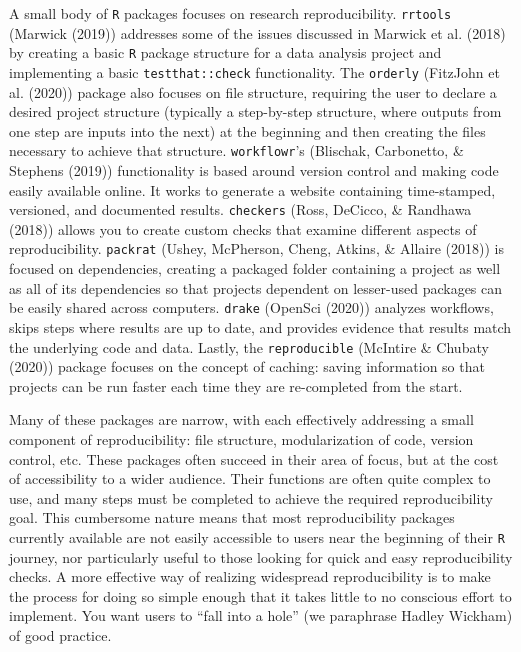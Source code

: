 \documentclass[12pt,twoside]{reedthesis}
\begin{document}
A small body of \texttt{R} packages focuses on research reproducibility.
\texttt{rrtools} (Marwick (2019)) addresses some of the issues discussed
in Marwick et al. (2018) by creating a basic \texttt{R} package
structure for a data analysis project and implementing a basic
\texttt{testthat::check} functionality. The \texttt{orderly} (FitzJohn
et al. (2020)) package also focuses on file structure, requiring the
user to declare a desired project structure (typically a step-by-step
structure, where outputs from one step are inputs into the next) at the
beginning and then creating the files necessary to achieve that
structure. \texttt{workflowr}'s (Blischak, Carbonetto, \& Stephens
(2019)) functionality is based around version control and making code
easily available online. It works to generate a website containing
time-stamped, versioned, and documented results. \texttt{checkers}
(Ross, DeCicco, \& Randhawa (2018)) allows you to create custom checks
that examine different aspects of reproducibility. \texttt{packrat}
(Ushey, McPherson, Cheng, Atkins, \& Allaire (2018)) is focused on
dependencies, creating a packaged folder containing a project as well as
all of its dependencies so that projects dependent on lesser-used
packages can be easily shared across computers. \texttt{drake} (OpenSci
(2020)) analyzes workflows, skips steps where results are up to date,
and provides evidence that results match the underlying code and data.
Lastly, the \texttt{reproducible} (McIntire \& Chubaty (2020)) package
focuses on the concept of caching: saving information so that projects
can be run faster each time they are re-completed from the start.

Many of these packages are narrow, with each effectively addressing a
small component of reproducibility: file structure, modularization of
code, version control, etc. These packages often succeed in their area
of focus, but at the cost of accessibility to a wider audience. Their
functions are often quite complex to use, and many steps must be
completed to achieve the required reproducibility goal. This cumbersome
nature means that most reproducibility packages currently available are
not easily accessible to users near the beginning of their \texttt{R}
journey, nor particularly useful to those looking for quick and easy
reproducibility checks. A more effective way of realizing widespread
reproducibility is to make the process for doing so simple enough that
it takes little to no conscious effort to implement. You want users to
``fall into a hole'' (we paraphrase Hadley Wickham) of good practice.
\end{document}
